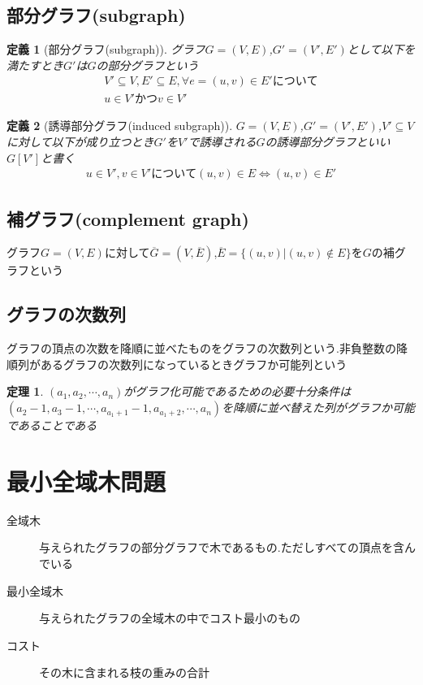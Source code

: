 \documentclass[a4j,10.5pt]{jarticle}
\newtheorem{defi}{定義}[section]
\newtheorem{theo}{定理}[section]
\begin{document}
\subsection{部分グラフ(subgraph)}
\begin{defi}[部分グラフ(subgraph)]
グラフ$G = (V,E)$,$G' = (V',E')$として以下を満たすとき$G'$は$G$の部分グラフという
\begin{eqnarray*}
V' \subseteq V,E' \subseteq E, 
\forall e = (u,v) \in E' について\\
u \in V' かつ v \in V'
\end{eqnarray*}
\end{defi}

\begin{defi}[誘導部分グラフ(induced subgraph)]
$G = (V,E)$,$G'=(V',E')$,$V'\subseteq V$に対して以下が成り立つとき$G'$を$V'$で誘導される$G$の誘導部分グラフといい$G[V']$と書く
\begin{eqnarray*}
u \in V',v \in V'について
(u,v) \in E \Leftrightarrow (u,v) \in E'
\end{eqnarray*}
\end{defi}

\subsection{補グラフ(complement graph)}
グラフ$G=(V,E)$に対して$\overline{G} = (V,\overline{E})$,$\overline{E} = \{(u,v)|(u,v) \notin E\}$を$G$の補グラフという

\subsection{グラフの次数列}
グラフの頂点の次数を降順に並べたものをグラフの次数列という.非負整数の降順列があるグラフの次数列になっているときグラフか可能列という

\begin{theo}
$(a_1,a_2,\cdots,a_n)$がグラフ化可能であるための必要十分条件は$(a_2 - 1,a_3 - 1,\cdots,a_{a_1 + 1} - 1,a_{a_1 + 2},\cdots,a_n)$を降順に並べ替えた列がグラフか可能であることである
\end{theo}

\newpage

\section{最小全域木問題}
\begin{description}
\item[全域木] 与えられたグラフの部分グラフで木であるもの.ただしすべての頂点を含んでいる
\item[最小全域木] 与えられたグラフの全域木の中でコスト最小のもの
\item[コスト] その木に含まれる枝の重みの合計
\end{description}
\end{document}
